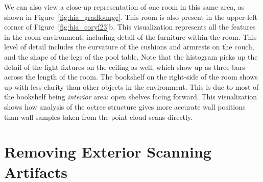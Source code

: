 \documentclass[12pt,onecolumn,oneside]{book}
\begin{document}
We can also view a close-up representation of one room in this same area, as shown in Figure~\ref{fig:hia_gradlounge}.  This room is also present in the upper-left corner of Figure~\ref{fig:hia_coryf23}b.  This visualization represents all the features in the room environment, including detail of the furniture within the room.  This level of detail includes the curvature of the cushions and armrests on the couch, and the shape of the legs of the pool table.  Note that the histogram picks up the detail of the light fixtures on the ceiling as well, which show up as three bars across the length of the room.  The bookshelf on the right-side of the room shows up with less clarity than other objects in the environment.  This is due to most of the bookshelf being {\it interior} area: open shelves facing forward.  This visualization shows how analysis of the octree structure gives more accurate wall positions than wall samples taken from the point-cloud scans directly.

\section{Removing Exterior Scanning Artifacts}
\label{sec:explosion_removal}
\end{document}
